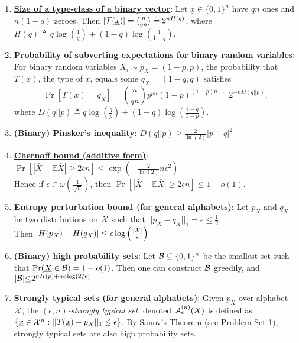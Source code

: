 \documentclass[10pt]{article}
\begin{document}
\begin{enumerate}
\item {\bf \underline{Size of a type-class of a binary vector}}: Let $\underline{x} \in \{0,1\}^n$ have $qn$ ones and $n(1-q)$ zeroes. Then $|{\cal T}(\underline{x})| = {{n}\choose{qn}} \doteq 2^{nH(q)}$, where $H(q) \triangleq q\log \left (\frac{1}{q} \right)+ (1-q)\log \left (\frac{1}{1-q} \right) $.

\item {\bf \underline{Probability of subverting expectations for binary random variables}}: For binary random variables $X_i \sim p_X = (1-p,p)$, the probability that $T(\underline{x})$, the type of $\underline{x}$, equals some $q_X = (1-q,q)$ satisfies
\begin{equation*}
	\Pr[T(\underline{x}) = q_X] = 	{{n}\choose{qn}} p^{pn}(1-p)^{(1-p)n} \doteq 2^{-nD(q||p)},
\end{equation*}
\noindent where $D(q||p) \triangleq q\log \left (\frac{q}{p} \right)+ (1-q)\log \left (\frac{1-q}{1-p} \right) $.

\item {\bf \underline{(Binary) Pinsker's inequality}}: $D(q||p)\geq \frac{2}{\ln(2)}|p-q|^2$

\item {\bf \underline{Chernoff bound (additive form)}}: $\Pr[|\bar{X}  -{\mathbb E}\bar{X}| \geq 2\epsilon n] \dot{\leq} \exp \left (-\frac{2}{\ln(2)}n\epsilon^2 \right )$\\
Hence if $\epsilon \in \omega\left (\frac{1}{\sqrt{n}} \right)$, then $\Pr[|\bar{X}  -{\mathbb E}\bar{X}| \geq 2\epsilon n] \leq 1-o(1)$.

\item {\bf \underline{Entropy perturbation bound (for general alphabets)}}: Let $p_X$ and $q_X$ be two distributions on ${\cal X}$ such that $||p_X- q_X||_1 = \epsilon \leq \frac{1}{2}$. \\Then $|H(p_X) - H(q_X)| \leq \epsilon \log \left( \frac{|\cal X|}{\epsilon} \right )$

\item {\bf \underline{(Binary) high probability sets}}: Let ${\cal B} \subseteq \{0,1\}^n$ be the smallest set such that $\Pr({\underline{X}}\in {\cal B}) = 1-o(1)$. Then one can construct ${\cal B}$ greedily, and $|{\cal B}| \dot{\leq} 2^{nH(p) + n\epsilon\log(2/\epsilon)}$

\item {\bf \underline{Strongly typical sets (for general alphabets)}}: Given $p_X$ over alphabet ${\cal X}$, the {\it $(\epsilon,n)$-strongly typical set}, denoted ${\cal A}^{(n)}_{\epsilon}(X)$ is defined as $\{{\underline{x}} \in  {\cal X}^n : ||T(\underline{x}) - p_X||_1 \leq \epsilon\}$. By Sanov's Theorem (see Problem Set 1), strongly typical sets are also high probability sets.


\end{enumerate}
\end{document}
